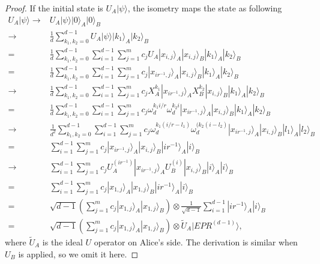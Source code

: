 \documentclass[11pt,letterpaper]{article}
\newcommand{\ket}[1]{|#1\rangle}
\newcommand{\x}{\otimes}
\DeclareMathOperator{\supp}{supp}
\newcommand{\1}{\mathbb{1}}
\newcommand{\CHSH}{CHSH^{(d)}}
\newcommand{\SVT}{SVT}
\newcommand{\EPR}[1]{EPR^{(#1)}}
\newcommand{\tU}{\tilde{U}}
\theoremstyle{definition}
\begin{document}
\begin{proof}
If the initial state is $U_A\ket{\psi}$, the isometry maps the state as following
\begin{align}
	U_A\ket{\psi} \to &U_A\ket{\psi}\ket{0}_A\ket{0}_B\\
	\to &\frac{1}{d} \sum_{k_1,k_2 =0}^{d-1} U_A\ket{\psi} \ket{k_1}_A \ket{k_2}_B \\
	= &\frac{1}{d} \sum_{k_1,k_2=0}^{d-1} \sum_{i=1}^{d-1}\sum_{j=1}^m c_j U_A\ket{x_{i,j}}_A\ket{x_{i,j}}_B
		\ket{k_1}_A \ket{k_2}_B\\
	= & \frac{1}{d} \sum_{k_1,k_2=0}^{d-1} \sum_{i=1}^{d-1}\sum_{j=1}^m c_j \ket{x_{i r^{-1} ,j}}_A\ket{x_{i,j}}_B
		\ket{k_1}_A \ket{k_2}_B\\
	\to &\frac{1}{d} \sum_{k_1,k_2 =0}^{d-1} \sum_{i=1}^{d-1}\sum_{j=1}^m c_j X_A^{k_1} \ket{x_{i r^{-1} ,j}}_A
	X_B^{k_2}\ket{x_{i,j}}_B  \ket{k_1}_A \ket{k_2}_B \\
	=&\frac{1}{d} \sum_{k_1,k_2 =0}^{d-1} \sum_{i=1}^{d-1}\sum_{j=1}^m c_j \omega_d^{k_1 i/r}\omega_d^{k_2i} \ket{x_{ir^{-1},j}}_A\ket{x_{i,j}}_B
		\ket{k_1}_A \ket{k_2}_B\\
	\to &\frac{1}{d^2}\sum_{k_1,k_2 =0}^{d-1} \sum_{i=1}^{d-1}\sum_{j=1}^m c_j \omega_d^{k_1(i/r-l_1)}\omega_d^{(k_2(i-l_2)} \ket{x_{ir^{-1},j}}_A\ket{x_{i,j}}_B
		\ket{l_1}_A \ket{l_2}_B\\
	=&\sum_{i=1}^{d-1}\sum_{j=1}^m c_j  \ket{x_{ir^{-1},j}}_A\ket{x_{i,j}}_B \ket{ir^{-1}}_A \ket{i}_B\\
	\to& \sum_{i=1}^{d-1}\sum_{j=1}^m c_j U_A^{(ir^{-1})}\ket{x_{ir^{-1},j}}_A U_B^{(i)}\ket{x_{i,j}}_B \ket{i}_A\ket{i}_B\\
	=&\sum_{i=1}^{d-1}\sum_{j=1}^m c_j \ket{x_{1,j}}_A \ket{x_{1,j}}_B \ket{ir^{-1}}_A\ket{i}_B\\
	=&\sqrt{d-1} \left(\sum_{j=1}^m c_j \ket{x_{1,j}}_A \ket{x_{1,j}}_B\right) \x 
		\frac{1}{\sqrt{d-1}} \sum_{i=1}^{d-1}\ket{ir^{-1}}_A\ket{i}_B\\
	=& \sqrt{d-1} \left(\sum_{j=1}^m c_j \ket{x_{1,j}}_A \ket{x_{1,j}}_B\right) \x \tU_A \ket{\EPR{d-1}},
\end{align}
where $\tU_A$ is the ideal $U$ operator on Alice's side.
The derivation is similar when $U_B$ is applied, so we omit it here.
\end{proof}
\end{document}
